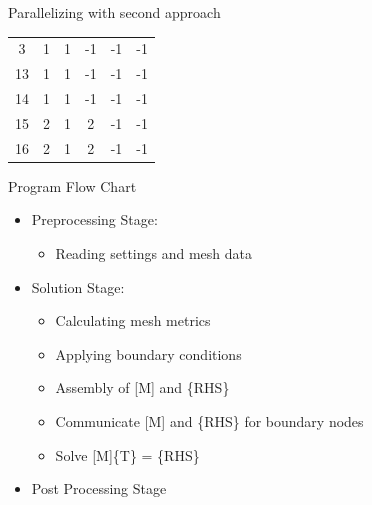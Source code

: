 \documentclass[t,english]{beamer}
\begin{document}
\begin{frame}{Parallelizing with second approach}
\begin{multicols}{2}
\begin{center}
\begin{tabular}{cccccc}
3 & 1 & 1 & -1 & -1 & -1 \\ 

13 & 1 & 1 & -1 & -1 & -1 \\ 

14 & 1 & 1 & -1 & -1 & -1 \\ 
 
15 & 2 & 1 & 2 & -1 & -1 \\ 
 
16 & 2 & 1 & 2 & -1 & -1 \\ 
\end{tabular} 
\end{center}

\end{multicols}
\end{frame}

\begin{frame}[c]{Program Flow Chart}
\begin{multicols}{2}
\begin{itemize}
\item[1]Preprocessing Stage:
	\begin{itemize}
	\item Reading settings and mesh data
	\end{itemize}
\item[2]Solution Stage:
	\begin{itemize}
	\item Calculating mesh metrics
	\item Applying boundary conditions
	\item Assembly of [M] and \{RHS\}
	\item Communicate [M] and \{RHS\} for boundary nodes
	\item Solve [M]\{T\} = \{RHS\}
	\end{itemize}
\item[3] Post Processing Stage
\end{itemize}
\columnbreak
\begin{figure}[ht!]
\centering

\end{figure}
\end{multicols}
\end{frame}
\end{document}
